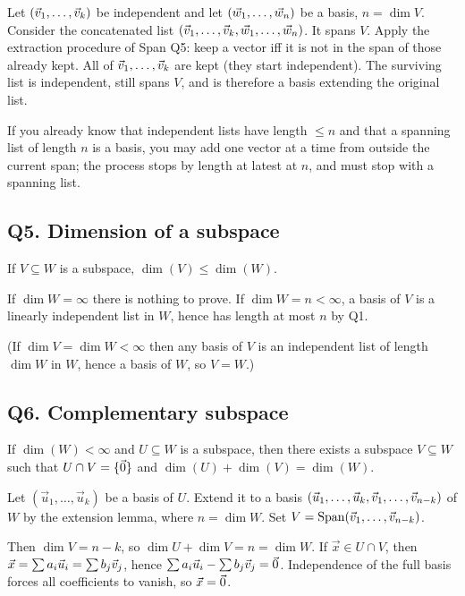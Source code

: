 \begin{coursebox}
Let $(\vec{v}_1,\ldots,\vec{v}_k)$ be independent and let $(\vec{w}_1,\ldots,\vec{w}_n)$ be a
basis, $n=\dim V$. Consider the concatenated list
$(\vec{v}_1,\ldots,\vec{v}_k,\vec{w}_1,\ldots,\vec{w}_n)$. It spans $V$. Apply the extraction
procedure of Span Q5: keep a vector iff it is not in the span of those already
kept. All of $\vec{v}_1,\ldots,\vec{v}_k$ are kept (they start independent). The
surviving list is independent, still spans $V$, and is therefore a basis
extending the original list.
\end{coursebox}

\begin{laterbox}
If you already know that independent lists have length $\le n$ and that a
spanning list of length $n$ is a basis, you may add one vector at a time from
outside the current span; the process stops by length at latest at $n$, and
must stop with a spanning list.
\end{laterbox}

\subsection{Q5. Dimension of a subspace}

\begin{promptbox}
If $V\subseteq W$ is a subspace, $\dim(V)\le\dim(W)$.
\end{promptbox}

\begin{coursebox}
If $\dim W=\infty$ there is nothing to prove. If $\dim W=n<\infty$, a basis of
$V$ is a linearly independent list in $W$, hence has length at most $n$ by Q1.

(If $\dim V=\dim W<\infty$ then any basis of $V$ is an independent list of
length $\dim W$ in $W$, hence a basis of $W$, so $V=W$.)
\end{coursebox}

\subsection{Q6. Complementary subspace}

\begin{promptbox}
If $\dim(W)<\infty$ and $U\subseteq W$ is a subspace, then there exists a
subspace $V\subseteq W$ such that $U\cap V=\{\vec{0}\}$ and
$\dim(U)+\dim(V)=\dim(W)$.
\end{promptbox}

\begin{coursebox}
Let $(\vec{u}_1,\ldots,\vec{u}_k)$ be a basis of $U$. Extend it to a basis
$(\vec{u}_1,\ldots,\vec{u}_k,\vec{v}_1,\ldots,\vec{v}_{n-k})$ of $W$ by the extension
lemma, where $n=\dim W$. Set $V=\operatorname{Span}(\vec{v}_1,\ldots,\vec{v}_{n-k})$.

Then $\dim V=n-k$, so $\dim U+\dim V=n=\dim W$. If $\vec{x}\in U\cap V$, then
$\vec{x}=\sum a_i\vec{u}_i=\sum b_j\vec{v}_j$, hence
$\sum a_i\vec{u}_i-\sum b_j\vec{v}_j=\vec{0}$. Independence of the full basis forces
all coefficients to vanish, so $\vec{x}=\vec{0}$.
\end{coursebox}

